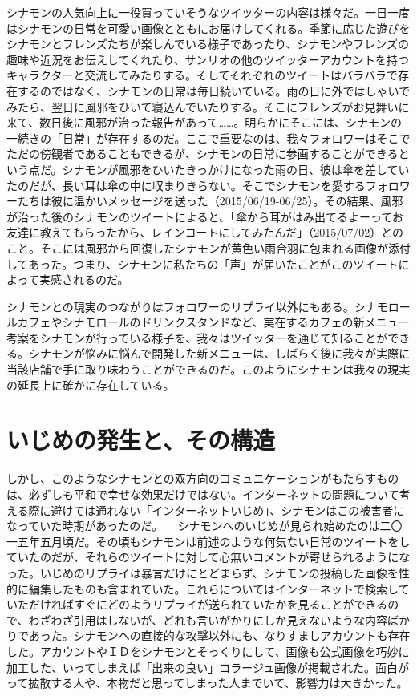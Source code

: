 \documentclass[b5j,twoside,twocolumn]{utarticle}
\begin{document}
シナモンの人気向上に一役買っていそうなツイッターの内容は様々だ。一日一度はシナモンの日常を可愛い画像とともにお届けしてくれる。季節に応じた遊びをシナモンとフレンズたちが楽しんでいる様子であったり、シナモンやフレンズの趣味や近況をお伝えしてくれたり、サンリオの他のツイッターアカウントを持つキャラクターと交流してみたりする。そしてそれぞれのツイートはバラバラで存在するのではなく、シナモンの日常は毎日続いている。雨の日に外ではしゃいでみたら、翌日に風邪をひいて寝込んでいたりする。そこにフレンズがお見舞いに来て、数日後に風邪が治った報告があって……。明らかにそこには、シナモンの一続きの「日常」が存在するのだ。ここで重要なのは、我々フォロワーはそこでただの傍観者であることもできるが、シナモンの日常に参画することができるという点だ。シナモンが風邪をひいたきっかけになった雨の日、彼は傘を差していたのだが、長い耳は傘の中に収まりきらない。そこでシナモンを愛するフォロワーたちは彼に温かいメッセージを送った（2015/06/19-06/25）。その結果、風邪が治った後のシナモンのツイートによると、「傘から耳がはみ出てるよーってお友達に教えてもらったから、レインコートにしてみたんだ」（2015/07/02）とのこと。そこには風邪から回復したシナモンが黄色い雨合羽に包まれる画像が添付してあった。つまり、シナモンに私たちの「声」が届いたことがこのツイートによって実感されるのだ。


シナモンとの現実のつながりはフォロワーのリプライ以外にもある。シナモロールカフェやシナモロールのドリンクスタンドなど、実在するカフェの新メニュー考案をシナモンが行っている様子を、我々はツイッターを通じて知ることができる。シナモンが悩みに悩んで開発した新メニューは、しばらく後に我々が実際に当該店舗で手に取り味わうことができるのだ。このようにシナモンは我々の現実の延長上に確かに存在している。


\section*{いじめの発生と、その構造}
しかし、このようなシナモンとの双方向のコミュニケーションがもたらすものは、必ずしも平和で幸せな効果だけではない。インターネットの問題について考える際に避けては通れない「インターネットいじめ」、シナモンはこの被害者になっていた時期があったのだ。
　シナモンへのいじめが見られ始めたのは二〇一五年五月頃だ。その頃もシナモンは前述のような何気ない日常のツイートをしていたのだが、それらのツイートに対して心無いコメントが寄せられるようになった。いじめのリプライは暴言だけにとどまらず、シナモンの投稿した画像を性的に編集したものも含まれていた。これらについてはインターネットで検索していただければすぐにどのようリプライが送られていたかを見ることができるので、わざわざ引用はしないが、どれも言いがかりにしか見えないような内容ばかりであった。シナモンへの直接的な攻撃以外にも、なりすましアカウントも存在した。アカウントやＩＤをシナモンとそっくりにして、画像も公式画像を巧妙に加工した、いってしまえば「出来の良い」コラージュ画像が掲載された。面白がって拡散する人や、本物だと思ってしまった人までいて、影響力は大きかった。
\end{document}
